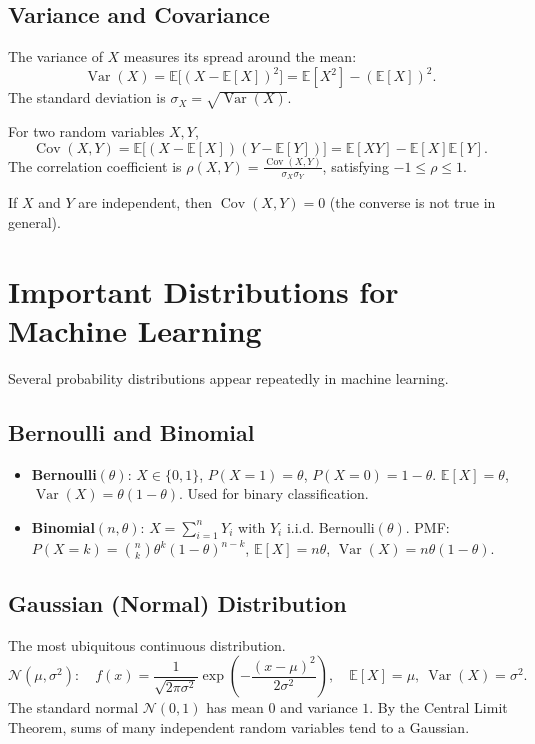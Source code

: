 \documentclass{tufte-handout}
\begin{document}
\subsection{Variance and Covariance}

\begin{defn}[Variance]
    The variance of $X$ measures its spread around the mean:
    \[
    \operatorname{Var}(X) = \mathbb{E}\bigl[(X - \mathbb{E}[X])^2\bigr] = \mathbb{E}[X^2] - (\mathbb{E}[X])^2.
    \]
    The standard deviation is $\sigma_X = \sqrt{\operatorname{Var}(X)}$.
\end{defn}

\begin{defn}
    For two random variables $X,Y$,
    \[
    \operatorname{Cov}(X,Y) = \mathbb{E}\bigl[(X - \mathbb{E}[X])(Y - \mathbb{E}[Y])\bigr] = \mathbb{E}[XY] - \mathbb{E}[X]\mathbb{E}[Y].
    \]
    The correlation coefficient is $\rho(X,Y) = \frac{\operatorname{Cov}(X,Y)}{\sigma_X \sigma_Y}$, satisfying $-1 \le \rho \le 1$.
\end{defn}

If $X$ and $Y$ are independent, then $\operatorname{Cov}(X,Y)=0$ (the converse is not true in general).

\section{Important Distributions for Machine Learning}

Several probability distributions appear repeatedly in machine learning.

\subsection{Bernoulli and Binomial}
\begin{itemize}
    \item \textbf{Bernoulli}$(\theta)$: $X \in \{0,1\}$, $P(X=1)=\theta$, $P(X=0)=1-\theta$. $\mathbb{E}[X]=\theta$, $\operatorname{Var}(X)=\theta(1-\theta)$. Used for binary classification.
    \item \textbf{Binomial}$(n,\theta)$: $X = \sum_{i=1}^n Y_i$ with $Y_i$ i.i.d. Bernoulli$(\theta)$. PMF: $P(X=k) = \binom{n}{k}\theta^k(1-\theta)^{n-k}$, $\mathbb{E}[X]=n\theta$, $\operatorname{Var}(X)=n\theta(1-\theta)$.
\end{itemize}

\subsection{Gaussian (Normal) Distribution}
The most ubiquitous continuous distribution.
\[
\mathcal{N}(\mu, \sigma^2):\quad f(x) = \frac{1}{\sqrt{2\pi\sigma^2}} \exp\!\left(-\frac{(x-\mu)^2}{2\sigma^2}\right),\quad \mathbb{E}[X]=\mu,\ \operatorname{Var}(X)=\sigma^2.
\]
The standard normal $\mathcal{N}(0,1)$ has mean $0$ and variance $1$. By the Central Limit Theorem, sums of many independent random variables tend to a Gaussian.
\end{document}
